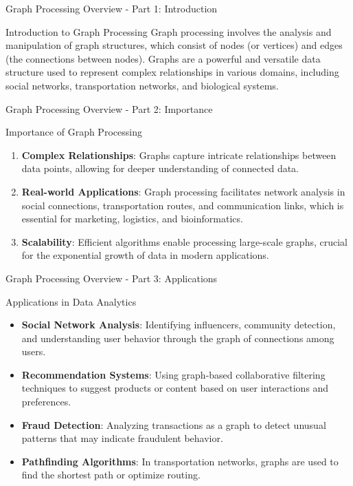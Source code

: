 \documentclass[aspectratio=169]{beamer}
\begin{document}
\begin{frame}[fragile]{Graph Processing Overview - Part 1: Introduction}
    \begin{block}{Introduction to Graph Processing}
        Graph processing involves the analysis and manipulation of graph structures, which consist of nodes (or vertices) and edges (the connections between nodes). Graphs are a powerful and versatile data structure used to represent complex relationships in various domains, including social networks, transportation networks, and biological systems.
    \end{block}
\end{frame}

\begin{frame}[fragile]{Graph Processing Overview - Part 2: Importance}
    \begin{block}{Importance of Graph Processing}
        \begin{enumerate}
            \item \textbf{Complex Relationships}: Graphs capture intricate relationships between data points, allowing for deeper understanding of connected data.
            \item \textbf{Real-world Applications}: Graph processing facilitates network analysis in social connections, transportation routes, and communication links, which is essential for marketing, logistics, and bioinformatics.
            \item \textbf{Scalability}: Efficient algorithms enable processing large-scale graphs, crucial for the exponential growth of data in modern applications.
        \end{enumerate}
    \end{block}
\end{frame}

\begin{frame}[fragile]{Graph Processing Overview - Part 3: Applications}
    \begin{block}{Applications in Data Analytics}
        \begin{itemize}
            \item \textbf{Social Network Analysis}: Identifying influencers, community detection, and understanding user behavior through the graph of connections among users.
            \item \textbf{Recommendation Systems}: Using graph-based collaborative filtering techniques to suggest products or content based on user interactions and preferences.
            \item \textbf{Fraud Detection}: Analyzing transactions as a graph to detect unusual patterns that may indicate fraudulent behavior.
            \item \textbf{Pathfinding Algorithms}: In transportation networks, graphs are used to find the shortest path or optimize routing.
        \end{itemize}
    \end{block}
\end{frame}
\end{document}
